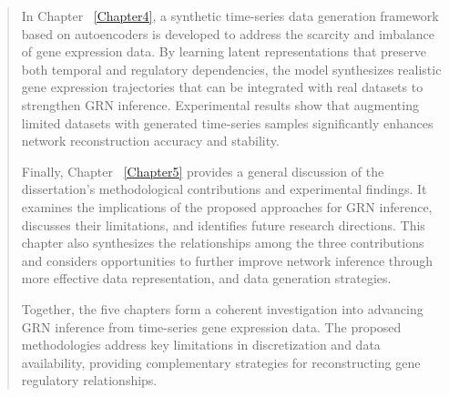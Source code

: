 \documentclass[
12pt, %
english, %
singlespacing, %
headsepline, %
]{MastersDoctoralThesis} %
\begin{document}
\begin{abstract}
In Chapter ~\ref{Chapter4}, a synthetic time-series data generation framework based on autoencoders is developed to address the scarcity and imbalance of gene expression data. By learning latent representations that preserve both temporal and regulatory dependencies, the model synthesizes realistic gene expression trajectories that can be integrated with real datasets to strengthen GRN inference. Experimental results show that augmenting limited datasets with generated time-series samples significantly enhances network reconstruction accuracy and stability.

Finally, Chapter ~\ref{Chapter5} provides a general discussion of the dissertation's methodological contributions and experimental findings. It examines the implications of the proposed approaches for GRN inference, discusses their limitations, and identifies future research directions. This chapter also synthesizes the relationships among the three contributions and considers opportunities to further improve network inference through more effective data representation, and data generation strategies.

Together, the five chapters form a coherent investigation into advancing GRN inference from time-series gene expression data. The proposed methodologies address key limitations in discretization and data availability, providing complementary strategies for reconstructing gene regulatory relationships.
\end{abstract}

\end{document}
